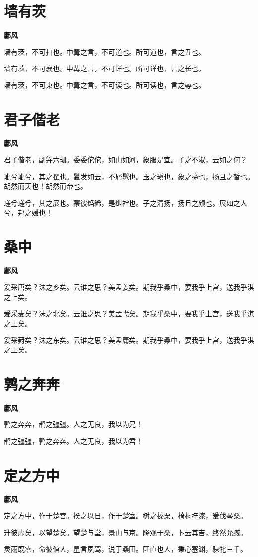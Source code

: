 \documentclass[12pt,a4paper]{ctexbook}
\begin{document}
\section{墙有茨}
\textbf{鄘风}\par\vspace{0.5em}
墙有茨，不可扫也。中冓之言，不可道也。所可道也，言之丑也。\par
墙有茨，不可襄也。中冓之言，不可详也。所可详也，言之长也。\par
墙有茨，不可束也。中冓之言，不可读也。所可读也，言之辱也。\par

\section{君子偕老}
\textbf{鄘风}\par\vspace{0.5em}
君子偕老，副笄六珈。委委佗佗，如山如河，象服是宜。子之不淑，云如之何？\par
玼兮玼兮，其之翟也。鬒发如云，不屑髢也。玉之瑱也，象之揥也，扬且之晳也。胡然而天也！胡然而帝也。\par
瑳兮瑳兮，其之展也。蒙彼绉絺，是绁袢也。子之清扬，扬且之颜也。展如之人兮，邦之媛也！\par

\section{桑中}
\textbf{鄘风}\par\vspace{0.5em}
爰采唐矣？沬之乡矣。云谁之思？美孟姜矣。期我乎桑中，要我乎上宫，送我乎淇之上矣。\par
爰采麦矣？沬之北矣。云谁之思？美孟弋矣。期我乎桑中，要我乎上宫，送我乎淇之上矣。\par
爰采葑矣？沬之东矣。云谁之思？美孟庸矣。期我乎桑中，要我乎上宫，送我乎淇之上矣。\par

\section{鹑之奔奔}
\textbf{鄘风}\par\vspace{0.5em}
鹑之奔奔，鹊之彊彊。人之无良，我以为兄！\par
鹊之彊彊，鹑之奔奔。人之无良，我以为君！\par

\section{定之方中}
\textbf{鄘风}\par\vspace{0.5em}
定之方中，作于楚宫。揆之以日，作于楚室。树之榛栗，椅桐梓漆，爰伐琴桑。\par
升彼虚矣，以望楚矣。望楚与堂，景山与京。降观于桑，卜云其吉，终然允臧。\par
灵雨既零，命彼倌人，星言夙驾，说于桑田。匪直也人，秉心塞渊，騋牝三千。\par
\end{document}
